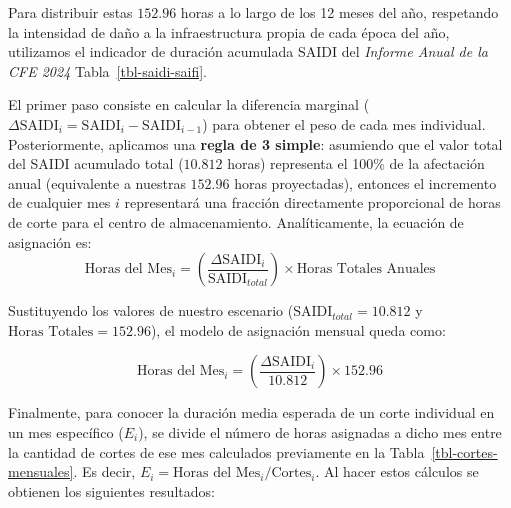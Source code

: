 \documentclass[
  spanish,
  us-letterpaper,
]{scrreprt}
\numberwithin{equation}{section}
\theoremstyle{plain}
\theoremstyle{plain}
\theoremstyle{definition}
\theoremstyle{plain}
\theoremstyle{remark}
\begin{document}
Para distribuir estas \(152.96\) horas a lo largo de los 12 meses del
año, respetando la intensidad de daño a la infraestructura propia de
cada época del año, utilizamos el indicador de duración acumulada SAIDI
del \emph{Informe Anual de la CFE 2024} Tabla~\ref{tbl-saidi-saifi}.

El primer paso consiste en calcular la diferencia marginal
(\(\Delta \text{SAIDI}_i = \text{SAIDI}_i - \text{SAIDI}_{i-1}\)) para
obtener el peso de cada mes individual. Posteriormente, aplicamos una
\textbf{regla de 3 simple}: asumiendo que el valor total del SAIDI
acumulado total (\(10.812\) horas) representa el 100\% de la afectación
anual (equivalente a nuestras \(152.96\) horas proyectadas), entonces el
incremento de cualquier mes \(i\) representará una fracción directamente
proporcional de horas de corte para el centro de almacenamiento.
Analíticamente, la ecuación de asignación es: \[
\text{Horas del Mes}_i = \left( \frac{\Delta \text{SAIDI}_i}{\text{SAIDI}_{total}} \right) \times \text{Horas Totales Anuales}
\]

Sustituyendo los valores de nuestro escenario
(\(\text{SAIDI}_{total} = 10.812\) y \(\text{Horas Totales} = 152.96\)),
el modelo de asignación mensual queda como:

\[
\text{Horas del Mes}_i = \left( \frac{\Delta \text{SAIDI}_i}{10.812} \right) \times 152.96
\]

Finalmente, para conocer la duración media esperada de un corte
individual en un mes específico (\(E_i\)), se divide el número de horas
asignadas a dicho mes entre la cantidad de cortes de ese mes calculados
previamente en la Tabla~\ref{tbl-cortes-mensuales}. Es decir,
\(E_i = \text{Horas del Mes}_i / \text{Cortes}_i\). Al hacer estos
cálculos se obtienen los siguientes resultados:
\end{document}
